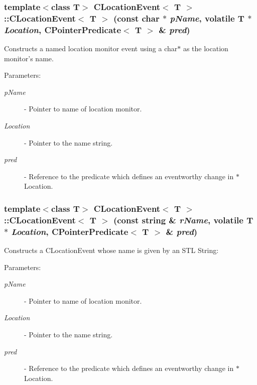 \subsubsection{\setlength{\rightskip}{0pt plus 5cm}template$<$class T$>$ CLocation\-Event$<$ T $>$::CLocation\-Event$<$ T $>$ (const char $\ast$ {\em p\-Name}, volatile T $\ast$ {\em Location}, {\bf CPointer\-Predicate}$<$ T $>$ \& {\em pred})}\label{classCLocationEvent_a1}


Constructs a named location monitor event using a char$\ast$ as the location monitor's name.\begin{Desc}
\item[Parameters: ]\par
\begin{description}
\item[{\em 
p\-Name}]- Pointer to name of location monitor. \item[{\em 
Location}]- Pointer to the name string. \item[{\em 
pred}]- Reference to the predicate which defines an eventworthy change in $\ast$Location. \end{description}
\end{Desc}
\subsubsection{\setlength{\rightskip}{0pt plus 5cm}template$<$class T$>$ CLocation\-Event$<$ T $>$::CLocation\-Event$<$ T $>$ (const string \& {\em r\-Name}, volatile T $\ast$ {\em Location}, {\bf CPointer\-Predicate}$<$ T $>$ \& {\em pred})}\label{classCLocationEvent_a2}


Constructs a CLocation\-Event whose name is given by an STL String: \begin{Desc}
\item[Parameters: ]\par
\begin{description}
\item[{\em 
p\-Name}]- Pointer to name of location monitor. \item[{\em 
Location}]- Pointer to the name string. \item[{\em 
pred}]- Reference to the predicate which defines an eventworthy change in $\ast$Location. \end{description}
\end{Desc}
